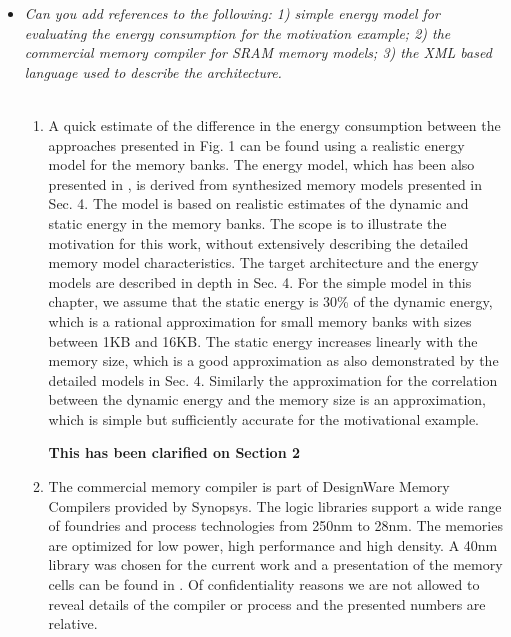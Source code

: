 \documentclass[12pt,a4paper,notitlepage]{article}
\begin{document}
\begin{itemize}
\item \textit{Can you add references to the following: 1) simple energy model for evaluating the energy consumption for the motivation example; 2) the commercial memory compiler for SRAM memory models; 3) the XML based language used to describe the architecture.}
\\
\\
\begin{enumerate}
\item A quick estimate of the difference in the energy consumption between the approaches presented in Fig. 1 can be found using a realistic energy model for the memory banks.
The energy model, which has been also presented in \cite{sharma2015array}, is derived from synthesized memory models presented in Sec. 4.
The model is based on realistic estimates of the dynamic and static energy in the memory banks.
The scope is to illustrate the motivation for this work, without extensively describing the detailed memory model characteristics. 
The target architecture and the energy models are described in depth in Sec. 4. 
For the simple model in this chapter, we assume that the static energy is 30\% of the dynamic energy, which is a rational approximation for small memory banks with sizes between 1KB and 16KB.
The static energy increases linearly with the memory size, which is a good approximation as also demonstrated by the detailed models in Sec. 4.
Similarly the approximation for the correlation between the dynamic energy and the memory size is an approximation, which is simple but sufficiently accurate for the motivational example.

\textbf{This has been clarified on Section 2}

\item The commercial memory compiler is part of DesignWare Memory Compilers provided by Synopsys.
The logic libraries support a wide range of foundries and process technologies from 250nm to 28nm. 
The memories are optimized for low power, high performance and high density. 
A 40nm library was chosen for the current work and a presentation of the memory cells can be found in \cite{40nm}.  
Of confidentiality reasons we are not allowed to reveal details of the compiler or process and the presented numbers are relative.


\end{enumerate}
\end{itemize}
\end{document}
